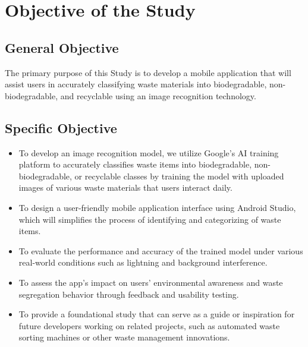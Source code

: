 \section{Objective of the Study}

\subsection{General Objective}
The primary purpose of this Study is to develop a mobile application that will assist users in accurately classifying waste materials into biodegradable, non-biodegradable, and recyclable using an image recognition technology.

\subsection{Specific Objective}
\begin{itemize}
	\item To develop an image recognition model, we utilize Google's AI training platform to accurately classifies waste items into biodegradable, non-biodegradable, or recyclable classes by training the model with uploaded images of various waste materials that users interact daily.
	
	\item To design a user-friendly mobile application interface using Android Studio, which will simplifies the process of identifying and categorizing of waste items.
	
	\item To evaluate the performance and accuracy of the trained model under various real-world conditions such as lightning and background interference.
	
	\item To assess the app's impact on users' environmental awareness and waste segregation behavior through feedback and usability testing.
	
	\item To provide a foundational study that can serve as a guide or inspiration for future developers working on related projects, such as automated waste sorting machines or other waste management innovations.
\end{itemize}
